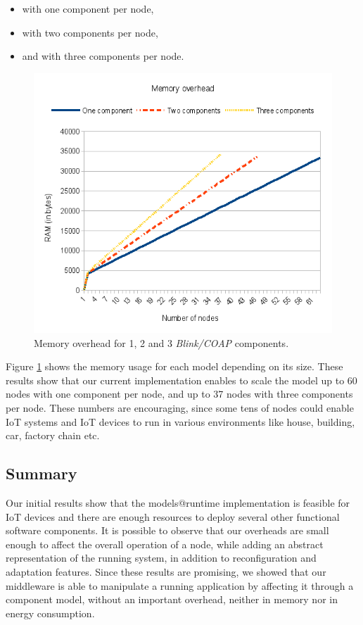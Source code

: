 \begin{itemize}
	\item with one component per node, 
	\item with two components per node,
	\item and with three components per node.
\end{itemize}

\begin{figure}[h]
	\centering
	\includegraphics[width=0.7\columnwidth]{chapters/modelsAtRuntimeContiki.images/MemoryOverhead3Nodes.png}
	\caption{Memory overhead for 1, 2 and 3 \emph{Blink/COAP} components.} \label{fig:MemUsedBlinkComps}
\end{figure}


Figure \ref{fig:MemUsedBlinkComps} shows the memory usage for each model depending on its size.
These results show that our current implementation enables to scale the model up to 60 nodes with one component per node, and up to 37 nodes with three components per node. These numbers are encouraging, since some tens of nodes could enable IoT systems and IoT devices to run in various environments like house, building, car, factory chain etc.

\subsection{Summary}

Our initial results show that the models@runtime implementation is feasible for IoT devices and there are enough resources to deploy several other functional software components.
It is possible to observe that our overheads are small enough to affect the overall operation of a node, while adding an abstract representation of the running system, in addition to reconfiguration and adaptation features.
Since these results are promising, we showed that our middleware is able to manipulate a running application by affecting it through a component model, without an important overhead, neither in memory nor in energy consumption.

